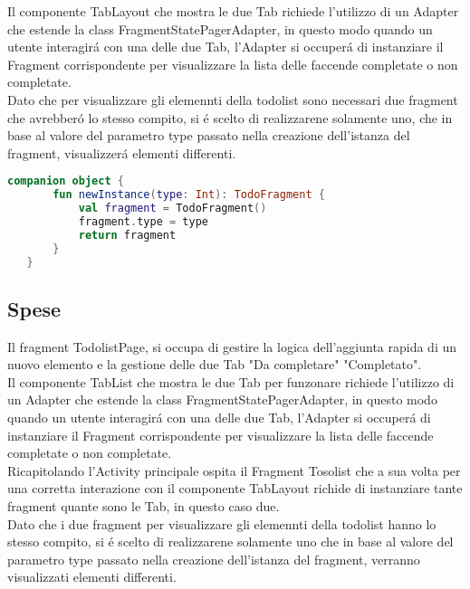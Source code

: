 Il componente TabLayout che mostra le due Tab richiede l'utilizzo di un Adapter che estende la class FragmentStatePagerAdapter, in questo modo quando un utente interagir\'a con una delle due Tab, l'Adapter si occuper\'a di instanziare il Fragment corrispondente per visualizzare la lista delle faccende completate o non completate.\\
Dato che per visualizzare gli elemennti della todolist sono necessari due fragment che avrebber\'o lo stesso compito, si \'e scelto di realizzarene solamente uno, che in base al valore del parametro type passato nella creazione dell'istanza del fragment, visualizzer\'a elementi differenti.\\



\begin{lstlisting}[language=kotlin,caption={FragmentTodo.kt}]
companion object {
       fun newInstance(type: Int): TodoFragment {
           val fragment = TodoFragment()
           fragment.type = type
           return fragment
       }
   }
\end{lstlisting}



\subsection{Spese}
Il fragment TodolistPage, si occupa di gestire la logica dell'aggiunta rapida di un nuovo elemento e la gestione delle due Tab "Da completare" "Completato".\\
Il componente TabList che mostra le due Tab per funzonare richiede l'utilizzo di un Adapter che estende la class FragmentStatePagerAdapter, in questo modo quando un utente interagir\'a con una delle due Tab, l'Adapter si occuper\'a di instanziare il Fragment corrispondente per visualizzare la lista delle faccende completate o non completate.\\
Ricapitolando l'Activity principale ospita il Fragment Tosolist che a sua volta per una corretta interazione con il componente TabLayout richide di instanziare tante fragment quante sono le Tab, in questo caso due.\\


Dato che i due fragment per visualizzare gli elemennti della todolist hanno lo stesso compito, si \'e scelto di realizzarene solamente uno che in base al valore del parametro type passato nella creazione dell'istanza del fragment, verranno visualizzati elementi differenti.\\


